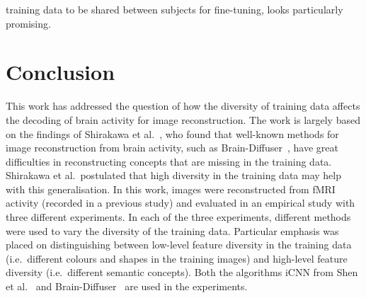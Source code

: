 training data to be shared between subjects for fine-tuning, looks particularly promising.


\section{Conclusion}


This work has addressed the question of how the diversity of training data affects the decoding of brain activity for image reconstruction. The work is largely based on the findings of Shirakawa et al.~\cite{shirakawaSpuriousReconstructionBrain2024}, who found that well-known methods for image reconstruction from brain activity, such as Brain-Diffuser~\cite{ozcelikNaturalSceneReconstruction2023}, have great difficulties in reconstructing concepts that are missing in the training data. Shirakawa et al.\ postulated that high diversity in the training data may help with this generalisation. In this work, images were reconstructed from fMRI activity (recorded in a previous study)  and evaluated in an empirical study with three different experiments. In each of the three experiments, different methods were used to vary the diversity of the training data. Particular emphasis was placed on distinguishing between low-level feature diversity in the training data (i.e.\ different colours and shapes in the training images) and high-level feature diversity (i.e.\ different semantic concepts). Both the algorithms iCNN from Shen et al.~\cite{shenDeepImageReconstruction2019} and Brain-Diffuser~\cite{ozcelikNaturalSceneReconstruction2023} are used in the experiments.


